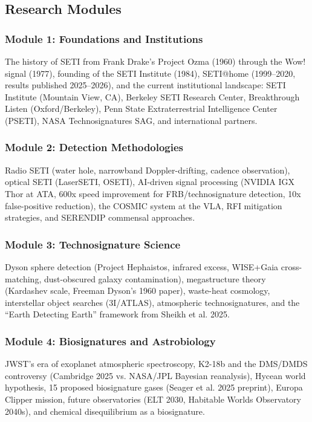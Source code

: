 \documentclass[11pt,letterpaper]{article}
\begin{document}
\subsection{Research Modules}

\subsubsection{Module 1: Foundations and Institutions}
The history of SETI from Frank Drake's Project Ozma (1960) through the Wow! signal (1977), founding of the SETI Institute (1984), SETI@home (1999--2020, results published 2025--2026), and the current institutional landscape: SETI Institute (Mountain View, CA), Berkeley SETI Research Center, Breakthrough Listen (Oxford/Berkeley), Penn State Extraterrestrial Intelligence Center (PSETI), NASA Technosignatures SAG, and international partners.

\subsubsection{Module 2: Detection Methodologies}
Radio SETI (water hole, narrowband Doppler-drifting, cadence observation), optical SETI (LaserSETI, OSETI), AI-driven signal processing (NVIDIA IGX Thor at ATA, 600x speed improvement for FRB/technosignature detection, 10x false-positive reduction), the COSMIC system at the VLA, RFI mitigation strategies, and SERENDIP commensal approaches.

\subsubsection{Module 3: Technosignature Science}
Dyson sphere detection (Project Hephaistos, infrared excess, WISE+Gaia cross-matching, dust-obscured galaxy contamination), megastructure theory (Kardashev scale, Freeman Dyson's 1960 paper), waste-heat cosmology, interstellar object searches (3I/ATLAS), atmospheric technosignatures, and the ``Earth Detecting Earth'' framework from Sheikh et al. 2025.

\subsubsection{Module 4: Biosignatures and Astrobiology}
JWST's era of exoplanet atmospheric spectroscopy, K2-18b and the DMS/DMDS controversy (Cambridge 2025 vs. NASA/JPL Bayesian reanalysis), Hycean world hypothesis, 15 proposed biosignature gases (Seager et al. 2025 preprint), Europa Clipper mission, future observatories (ELT 2030, Habitable Worlds Observatory 2040s), and chemical disequilibrium as a biosignature.
\end{document}
